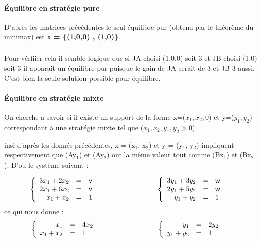 \documentclass[a4paper, 12pt, twoside]{article}
\begin{document}
\paragraph{Équilibre en stratégie pure}
D'après les matrices précédentes  le seul équilibre pur (obtenu par le théorème du \textsf{minimax}) est  \textbf{x = \{(1,0,0) , (1,0)\}}.
\subparagraph*{}{Pour vérfiier cela il semble logique que si JA choisi (1,0,0) \textsf{soit 3} et JB choisi (1,0) \textsf{soit  3} il apparait un équilibre pur puisque le gain de JA serait de 3 et JB 3 aussi. C'est bien la seule solution possible pour équilibre.

\paragraph{Équilibre en stratégie mixte}
On cherche a savoir si il existe un support de la forme x=($x_{1},x_{2},0$) et y=($y_{1}, y_{2}$) correspondant à une stratégie mixte tel que ($x_{1},x_{2},y_{1}, y_{2} > 0$). 

insi d'après les donnés précédentes, x = (x$_{1}$, x$_{2}$) et y = (y$_{1}$, y$_{2}$) impliquent respectivement que (Ay$ _{1} $) et (Ay$ _{2} $) ont la même valeur tout comme (Bx$ _{1} $) et (Bx$ _{2} $). D'ou le système suivant : }
\begin{align*}
\left \{
   \begin{array}{r c l}
      3x_{1} + 2x_{2} & = & \textsf{v} \\
      2x_{1} +6x_{2}  & = &\textsf{v}  \\
      x_{1} + x_{2} & = & 1
   \end{array}
   \right.
   & \hspace{3 cm}
   \left \{
   \begin{array}{r c l}
     3y_{1} + 3y_{2} & = & \textsf{w} \\
     2y_{1} + 5y_{2}  & = &\textsf{w}  \\
      y_{1} + y_{2} & = & 1
   \end{array}
   \right .
\end{align*}
ce qui nous donne : 
\begin{align*}
\left \{
   \begin{array}{r c l}
      x_{1}  & = & 4x_{2} \\
      x_{1} + x_{2} & = & 1 
   \end{array}
   \right.
   & \hspace{3 cm}
   \left \{
   \begin{array}{r c l}
     y_{1} & = & 2y_{2}  \\
      y_{1} + y_{2} & = & 1  
   \end{array}
   \right .
\end{align*}
\end{document}
